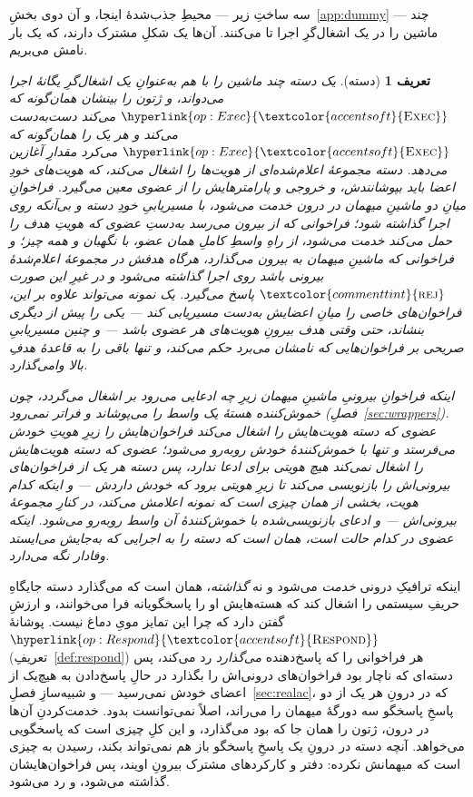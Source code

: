 \documentclass[10pt,oneside,openany]{book}
\newcommand{\op}[1]{\textnormal{\textsc{#1}}}
\newcommand{\opl}[1]{\hyperlink{op:#1}{\textcolor{accentsoft}{\op{#1}}}}
\newcommand{\atom}[1]{\textcolor{commenttint}{\op{#1}}}
\newcommand{\rej}{\atom{rej}}
\theoremstyle{accentdef}
\newtheorem{definition}{تعریف}[chapter]
\theoremstyle{accentplain}
\begin{document}
سه ساختِ زیر --- محیطِ جذب‌شدهٔ اینجا، و آن دوی
بخشِ~\ref{app:dummy} --- چند ماشین را در یک اشغال‌گرِ اجرا تا می‌کنند.
آن‌ها یک شکلِ مشترک دارند، که یک بار نامش می‌بریم.

\begin{definition}[دسته]\label{def:bundle}
یک \emph{دسته} چند ماشین را با هم به‌عنوانِ یک اشغال‌گرِ یگانهٔ اجرا
می‌دواند، و ژتون را بینشان همان‌گونه که $\opl{Exec}$ می‌کند دست‌به‌دست
می‌کند و هر یک را همان‌گونه که $\opl{Exec}$ می‌کرد مقدارِ آغازین می‌دهد.
دسته مجموعهٔ اعلام‌شده‌ای از هویت‌ها را اشغال می‌کند، که هویت‌های خودِ
اعضا باید بپوشانندش، و خروجی و پارامترهایش را از عضوی معین می‌گیرد.
فراخوانِ میانِ دو ماشینِ میهمان در درون خدمت می‌شود، با مسیریابیِ خودِ
دسته و \emph{بی‌آنکه روی اجرا گذاشته شود}؛ فراخوانی که از بیرون می‌رسد
به‌دستِ عضوی که هویتِ هدف را حمل می‌کند خدمت می‌شود، از راهِ واسطِ کاملِ
همان عضو، با نگهبان و همه چیز؛ و فراخوانی که ماشینِ میهمان به بیرون
می‌گذارد، هرگاه هدفش در مجموعهٔ اعلام‌شدهٔ \emph{بیرونی} باشد روی اجرا
گذاشته می‌شود و در غیرِ این صورت $\rej$ پاسخ می‌گیرد. یک نمونه می‌تواند
علاوه بر این، فراخوان‌های خاصی را میانِ اعضایش به‌دست مسیریابی کند --- یکی
را پیش از دیگری بنشاند، حتی وقتی هدف بیرونِ هویت‌های هر عضوی باشد --- و
چنین مسیریابیِ صریحی بر فراخوان‌هایی که نامشان می‌برد حکم می‌کند، و تنها
باقی را به قاعدهٔ هدفِ بالا وامی‌گذارد.

اینکه فراخوانِ بیرونیِ ماشینِ میهمان زیرِ چه ادعایی می‌رود بر اشغال
می‌گردد، چون خموش‌کننده هستهٔ یک واسط را می‌پوشاند و فراتر نمی‌رود
(فصلِ~\ref{sec:wrappers}). عضوی \emph{که دسته هویت‌هایش را اشغال می‌کند}
فراخوان‌هایش را زیرِ هویتِ خودش می‌فرستد و تنها با خموش‌کنندهٔ خودش
روبه‌رو می‌شود؛ عضوی \emph{که دسته هویت‌هایش را اشغال نمی‌کند} هیچ هویتی
برای ادعا ندارد، پس دسته هر یک از فراخوان‌های بیرونی‌اش را بازنویسی
می‌کند تا زیرِ هویتی برود که خودش داردش --- و اینکه کدام هویت، بخشی از
همان چیزی است که نمونه اعلامش می‌کند، در کنارِ مجموعهٔ بیرونی‌اش --- و
ادعای بازنویسی‌شده با خموش‌کنندهٔ آن واسط روبه‌رو می‌شود. اینکه عضوی در
کدام حالت است، همان است که دسته را به اجرایی که به‌جایش می‌ایستد وفادار
نگه می‌دارد.
\end{definition}

اینکه ترافیکِ درونی \emph{خدمت} می‌شود و نه \emph{گذاشته}، همان است که
می‌گذارد دسته جایگاهِ حریفِ سیستمی را اشغال کند که هسته‌هایش او را
پاسخگویانه فرا می‌خوانند، و ارزشِ گفتن دارد که چرا این تمایز مویِ دماغ
نیست. پوشانهٔ $\opl{Respond}$ (تعریفِ~\ref{def:respond}) هر فراخوانی را
که پاسخ‌دهنده \emph{می‌گذارد} رد می‌کند، پس دسته‌ای که ناچار بود
فراخوان‌های درونی‌اش را بگذارد در حالِ پاسخ‌دادن به هیچ‌یک از اعضای خودش
نمی‌رسید --- و شبیه‌سازِ فصلِ~\ref{sec:realac}، که در درونِ هر یک از دو
پاسخِ پاسخگو سه دورگهٔ میهمان را می‌راند، اصلاً نمی‌توانست بدود. خدمت‌کردنِ
آن‌ها در درون، ژتون را همان جا که بود می‌گذارد، و این کلِ چیزی است که
پاسخگویی می‌خواهد. آنچه دسته در درونِ یک پاسخِ پاسخگو باز هم نمی‌تواند
بکند، رسیدن به چیزی است که میهمانش نکرده: دفتر و کارکردهای مشترک بیرونِ
اویند، پس فراخوان‌هایشان گذاشته می‌شود، و رد می‌شود.
\end{document}
